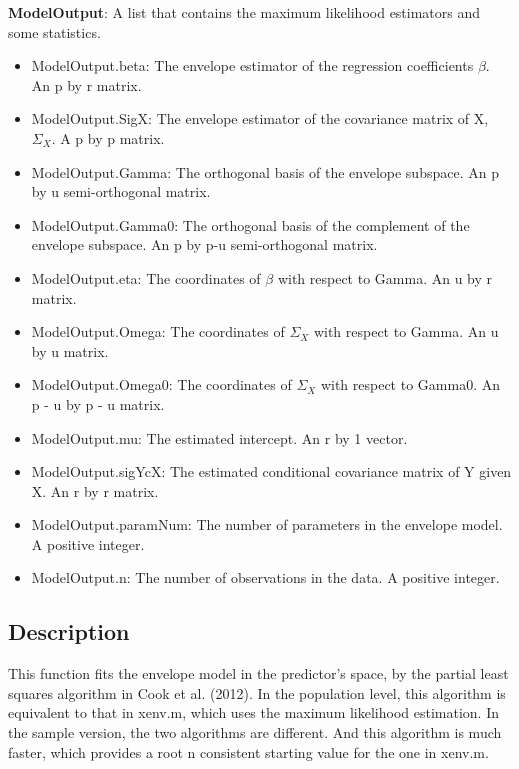 \documentclass[a4paper,11pt,openany]{memoir}
\begin{document}
\begin{par}
\textbf{ModelOutput}: A list that contains the maximum likelihood estimators and some statistics.
\end{par} \vspace{1em}
\begin{itemize}
\setlength{\itemsep}{-1ex}
   \item ModelOutput.beta: The envelope estimator of the regression coefficients $\beta$. An p by r matrix.
   \item ModelOutput.SigX: The envelope estimator of the covariance matrix of X, $\Sigma_X$.  A p by p matrix.
   \item ModelOutput.Gamma: The orthogonal basis of the envelope subspace. An p by u semi-orthogonal matrix.
   \item ModelOutput.Gamma0: The orthogonal basis of the complement of the envelope subspace.  An p by p-u semi-orthogonal matrix.
   \item ModelOutput.eta: The coordinates of $\beta$ with respect to Gamma. An u by r matrix.
   \item ModelOutput.Omega: The coordinates of $\Sigma_X$ with respect to Gamma. An u by u matrix.
   \item ModelOutput.Omega0: The coordinates of $\Sigma_X$ with respect to Gamma0. An p - u by p - u matrix.
   \item ModelOutput.mu: The estimated intercept.  An r by 1 vector.
   \item ModelOutput.sigYcX: The estimated conditional covariance matrix of Y given X. An r by r matrix.
   \item ModelOutput.paramNum: The number of parameters in the envelope model.  A positive integer.
   \item ModelOutput.n: The number of observations in the data.  A positive integer.
\end{itemize}


\subsection*{Description}

\begin{par}
This function fits the envelope model in the predictor's space, by the partial least squares algorithm in Cook et al. (2012). In the population level, this algorithm is equivalent to that in xenv.m, which uses the maximum likelihood estimation.  In the sample version, the two algorithms are different.  And this algorithm is much faster, which provides a root n consistent starting value for the one in xenv.m.
\end{par} \vspace{1em}
\end{document}
